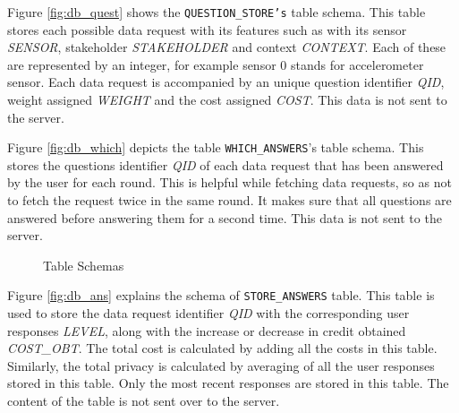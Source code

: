 Figure \ref{fig:db_quest} shows the \texttt{QUESTION\_STORE's} table schema. This table stores each possible data request with its features such as with its sensor \textit{SENSOR}, stakeholder \textit{STAKEHOLDER} and context \textit{CONTEXT}. Each of these are represented by an integer, for example sensor 0 stands for accelerometer sensor. Each data request is accompanied by
an unique question identifier \textit{QID}, weight assigned \textit{WEIGHT} and the cost assigned \textit{COST}. This data is not sent to 
the server.

Figure \ref{fig:db_which} depicts the table \texttt{WHICH\_ANSWERS}'s table schema. This stores the questions identifier \textit{QID} of each data request that has
been answered by the user for each round. This is helpful while fetching data requests, so as not to fetch the request twice in the same round. It makes sure that all questions are answered before answering them for a second time. This data is not sent to the server.

\begin{figure}[htp]
 \hspace{1em}
\caption{Table Schemas}
\label{fig:ts11}
\end{figure}

Figure \ref{fig:db_ans} explains the schema of \texttt{STORE\_ANSWERS} table. This table is used to store the data request identifier \textit{QID} with the corresponding
user responses \textit{LEVEL}, along with the increase or decrease in credit obtained \textit{COST\_OBT}. The total cost is calculated by adding all the costs in this table. Similarly, the total privacy is calculated by averaging of all the user responses stored in this table. Only the most recent responses are stored in this table. The content of the table is not sent over to the server.

